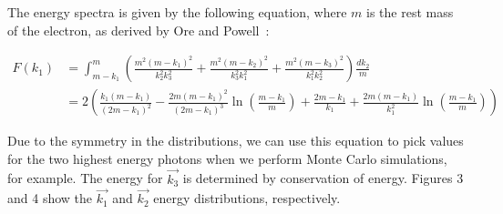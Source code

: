  The energy spectra is given by the following equation, where $m$ is the rest mass of the electron, as derived by Ore and Powell~\cite{PhysRev.75.1696}:

 \begin{align}
 F(k_{1})&={\int}^{m}_{m-k_{1}}\left(\frac{m^2(m-k_{1})^2}{k_{2}^2k_{3}^2}+\frac{m^2(m-k_{2})^2}{k_{3}^2k_{1}^2}+\frac{m^{2}(m-k_{3})^2}{k_{1}^{2}k_{2}^{2}}\right)\frac{dk_{2}}{m} \\
 &=2\left(\frac{k_{1}(m-k_{1})}{(2m-k_{1})^{2}}-\frac{2m(m-k_{1})^{2}}{(2m-k_{1})^{3}}\ln\left(\frac{m-k_{1}}{m}\right)+\frac{2m-k_{1}}{k_{1}}+\frac{2m(m-k_{1})}{k_{1}^{2}}\ln\left(\frac{m-k_{1}}{m}\right)\right)
 \end{align}

Due to the symmetry in the distributions, we can use this equation to pick values for the two highest energy photons when we perform Monte Carlo simulations, for example. The energy for $\vec{k_{3}}$ is determined by conservation of energy. Figures 3 and 4 show the $\vec{k_{1}}$ and $\vec{k_{2}}$ energy distributions, respectively.

